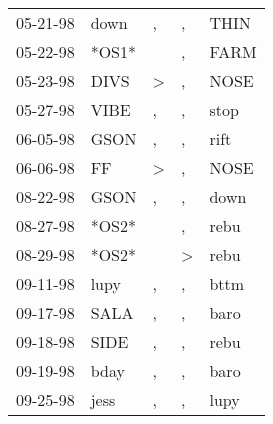 \begin{supertabular}{p{0.07\textwidth}p{0.06\textwidth}p{0.02\textwidth}p{0.02\textwidth}p{0.06\textwidth}}
          05-21-98\textsuperscript{} &           down\textsuperscript{} &                , &                , &           THIN\textsuperscript{} \\
          05-22-98\textsuperscript{} &                            *OS1* &                  &                , &           FARM\textsuperscript{} \\
          05-23-98\textsuperscript{} &           DIVS\textsuperscript{} &     \textgreater &                , &           NOSE\textsuperscript{} \\
          05-27-98\textsuperscript{} &           VIBE\textsuperscript{} &                , &                , &           stop\textsuperscript{} \\
          06-05-98\textsuperscript{} &           GSON\textsuperscript{} &                , &                , &           rift\textsuperscript{} \\
          06-06-98\textsuperscript{} &             FF\textsuperscript{} &     \textgreater &                , &           NOSE\textsuperscript{} \\
          08-22-98\textsuperscript{} &           GSON\textsuperscript{} &                , &                , &           down\textsuperscript{} \\
          08-27-98\textsuperscript{} &                            *OS2* &                  &                , &           rebu\textsuperscript{} \\
          08-29-98\textsuperscript{} &                            *OS2* &                  &     \textgreater &           rebu\textsuperscript{} \\
          09-11-98\textsuperscript{} &           lupy\textsuperscript{} &                , &                , &           bttm\textsuperscript{} \\
          09-17-98\textsuperscript{} &           SALA\textsuperscript{} &                , &                , &           baro\textsuperscript{} \\
          09-18-98\textsuperscript{} &           SIDE\textsuperscript{} &                , &                , &           rebu\textsuperscript{} \\
          09-19-98\textsuperscript{} &           bday\textsuperscript{} &                , &                , &           baro\textsuperscript{} \\
          09-25-98\textsuperscript{} &           jess\textsuperscript{} &                , &                , &           lupy\textsuperscript{} \\

\end{supertabular}
